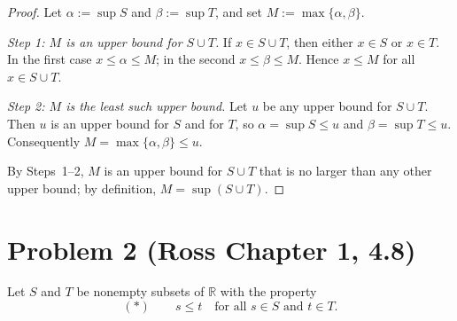 \documentclass[12pt]{article}
\begin{document}
\begin{proof}
Let $\alpha:=\sup S$ and $\beta:=\sup T$, and set $M:=\max\{\alpha,\beta\}$.

\emph{Step 1: $M$ is an upper bound for $S\cup T$.}
If $x\in S\cup T$, then either $x\in S$ or $x\in T$.
In the first case $x\le \alpha\le M$; in the second $x\le \beta\le M$.
Hence $x\le M$ for all $x\in S\cup T$.

\emph{Step 2: $M$ is the least such upper bound.}
Let $u$ be any upper bound for $S\cup T$.
Then $u$ is an upper bound for $S$ and for $T$, so
$\alpha=\sup S\le u$ and $\beta=\sup T\le u$. Consequently
$M=\max\{\alpha,\beta\}\le u$.

By Steps~1–2, $M$ is an upper bound for $S\cup T$ that is no larger
than any other upper bound; by definition, $M=\sup(S\cup T)$.
\end{proof}

\section*{Problem 2 (Ross Chapter 1, 4.8)}
Let $S$ and $T$ be nonempty subsets of $\mathbb{R}$ with the property
\[
(\ast)\qquad s\le t \quad\text{for all } s\in S \text{ and } t\in T .
\]
\end{document}
